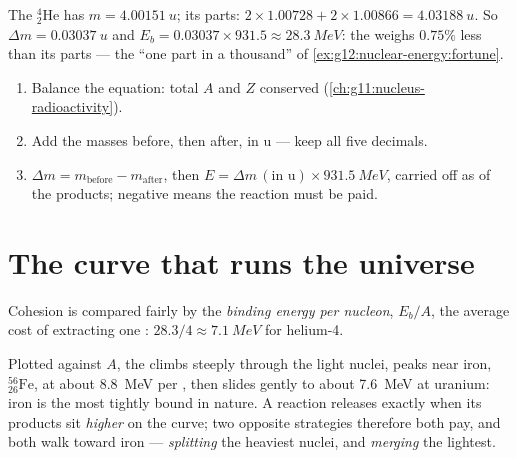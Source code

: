 \begin{example}[Helium-4]\label{ex:g12:nuclear-energy:helium}
The ${}^{4}_{2}\mathrm{He}$  has $m = \qty{4.00151}{u}$; its parts:
$2 \times 1.00728 + 2 \times 1.00866 = \qty{4.03188}{u}$. So
$\Delta m = \qty{0.03037}{u}$ and $E_b = 0.03037 \times 931.5 \approx
\qty{28.3}{MeV}$: the  weighs $0.75\%$ less than its parts --- the
``one part in a thousand'' of \cref{ex:g12:nuclear-energy:fortune}.
\end{example}

\begin{method}\label{met:g12:nuclear-energy:balance}
\begin{enumerate}
  \item Balance the equation: total $A$ and $Z$ conserved (\cref{ch:g11:nucleus-radioactivity}).
  \item Add the masses before, then after, in \unit{u} --- keep all five decimals.
  \item $\Delta m = m_{\text{before}} - m_{\text{after}}$, then
        $E = \Delta m\,(\text{in u}) \times \qty{931.5}{MeV}$, carried off as
         of the products; negative means the reaction must be paid.
\end{enumerate}
\end{method}

\section{The curve that runs the universe}

\begin{definition}\label{def:g12:nuclear-energy:pernucleon}
Cohesion is compared fairly by the \emph{binding energy per
nucleon}, $E_b/A$, the average cost of
extracting one : $28.3/4 \approx \qty{7.1}{MeV}$ for helium-4.
\end{definition}

\begin{proposition}\label{prop:g12:nuclear-energy:ironpeak}
Plotted against $A$, the  climbs steeply through
the light nuclei, peaks near iron, ${}^{56}_{26}\mathrm{Fe}$, at about
\qty{8.8}{MeV} per , then slides gently to about \qty{7.6}{MeV} at
uranium: iron is the most tightly bound  in nature. A reaction
releases  exactly when its products sit \emph{higher} on the curve; two
opposite strategies therefore both pay, and both walk toward iron ---
\emph{splitting} the heaviest nuclei, and \emph{merging} the lightest.
\end{proposition}
\admitted

